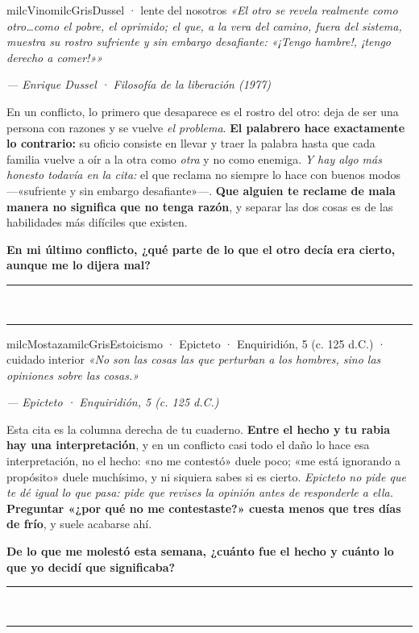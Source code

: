 \documentclass[11pt,letterpaper]{article}
\newcommand{\linead}[1]{\noindent\color{milcLinea}\rule{#1}{0.5pt}\color{milcNegro}}
\begin{document}
\begin{softbox}{milcVino}{milcGris}{Dussel · lente del nosotros}
\textit{«El otro se revela realmente como otro\ldots como el pobre, el oprimido; el que, a la vera del camino, fuera del sistema, muestra su rostro sufriente y sin embargo desafiante: «¡Tengo hambre!, ¡tengo derecho a comer!»»}

{\footnotesize\itshape\color{milcNegro!70}--- Enrique Dussel · Filosofía de la liberación (1977)}

En un conflicto, lo primero que desaparece es el rostro del otro: deja de ser una persona con razones y se vuelve \emph{el problema}. \textbf{El palabrero hace exactamente lo contrario:} su oficio consiste en llevar y traer la palabra hasta que cada familia vuelve a oír a la otra como \emph{otra} y no como enemiga. \emph{Y hay algo más honesto todavía en la cita:} el que reclama no siempre lo hace con buenos modos ---«sufriente y sin embargo desafiante»---. \textbf{Que alguien te reclame de mala manera no significa que no tenga razón}, y separar las dos cosas es de las habilidades más difíciles que existen.

\textbf{En mi último conflicto, ¿qué parte de lo que el otro decía era cierto, aunque me lo dijera mal?}
\end{softbox}
\linead{\linewidth}\\[1mm]
\linead{\linewidth}

\begin{softbox}{milcMostaza}{milcGris}{Estoicismo · Epicteto · Enquiridión, 5 (c. 125 d.C.) · cuidado interior}
\textit{«No son las cosas las que perturban a los hombres, sino las opiniones sobre las cosas.»}

{\footnotesize\itshape\color{milcNegro!70}--- Epicteto · Enquiridión, 5 (c. 125 d.C.)}

Esta cita es la columna derecha de tu cuaderno. \textbf{Entre el hecho y tu rabia hay una interpretación}, y en un conflicto casi todo el daño lo hace esa interpretación, no el hecho: «no me contestó» duele poco; «me está ignorando a propósito» duele muchísimo, y ni siquiera sabes si es cierto. \emph{Epicteto no pide que te dé igual lo que pasa: pide que revises la opinión antes de responderle a ella.} \textbf{Preguntar «¿por qué no me contestaste?» cuesta menos que tres días de frío}, y suele acabarse ahí.

\textbf{De lo que me molestó esta semana, ¿cuánto fue el hecho y cuánto lo que yo decidí que significaba?}
\end{softbox}
\linead{\linewidth}\\[1mm]
\linead{\linewidth}
\end{document}
